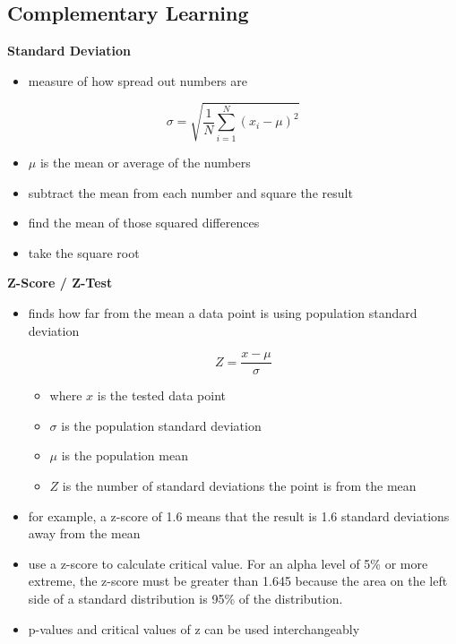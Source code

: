 \documentclass[
]{article}
\author{}
\date{}
\begin{document}
\hypertarget{header-n0}{%
\subsection{Complementary Learning}\label{header-n0}}

\textbf{Standard Deviation}

\begin{itemize}
\item
  measure of how spread out numbers are
\end{itemize}

\[\sigma = \sqrt{{\frac{1}{N}}\sum^N_{i=1}(x_i - \mu)^2}\]

\begin{itemize}
\item
  \(\mu\) is the mean or average of the numbers
\item
  subtract the mean from each number and square the result
\item
  find the mean of those squared differences
\item
  take the square root
\end{itemize}

\textbf{Z-Score / Z-Test}

\begin{itemize}
\item
  finds how far from the mean a data point is using population standard
  deviation

  \[Z = \frac{x-\mu}{\sigma}\]

  \begin{itemize}
  \item
    where \(x\) is the tested data point
  \item
    \(\sigma\) is the population standard deviation
  \item
    \(\mu\) is the population mean
  \item
    \(Z\) is the number of standard deviations the point is from the
    mean
  \end{itemize}
\item
  for example, a z-score of 1.6 means that the result is 1.6 standard
  deviations away from the mean
\item
  use a z-score to calculate critical value. For an alpha level of 5\%
  or more extreme, the z-score must be greater than 1.645 because the
  area on the left side of a standard distribution is 95\% of the
  distribution.
\item
  p-values and critical values of z can be used interchangeably
\end{itemize}
\end{document}
